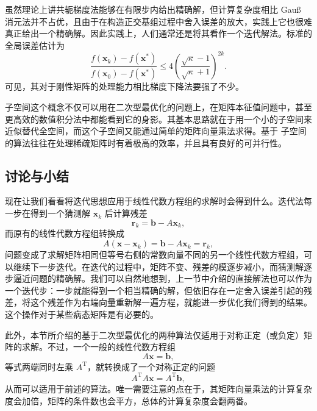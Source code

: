 虽然理论上讲共轭梯度法能够在有限步内给出精确解，但计算复杂度相比 Gauß 消元法并不占优，且由于在构造正交基组过程中舍入误差的放大，实践上它也很难真正给出一个精确解。因此实践上，人们通常还是将其看作一个迭代解法。标准的全局误差估计为
\begin{equation}
\frac{f(\bm x_k)-f(\bm x^*)}{f(\bm x_0)-f(\bm x^*)}
\le 4\left(\frac{\sqrt\kappa-1}{\sqrt\kappa+1}\right)^{2k}.
\tag{3.2.34}
\end{equation}
可见，其对于刚性矩阵的处理能力相比梯度下降法要强了不少。

 子空间这个概念不仅可以用在二次型最优化的问题上，在矩阵本征值问题中，甚至更高效的数值积分法中都能看到它的身影。其基本思路就在于用一个小的子空间来近似替代全空间，而这个子空间又能通过简单的矩阵向量乘法求得。基于  子空间的算法往往在处理稀疏矩阵时有着极高的效率，并且具有良好的可并行性。

\subsection{讨论与小结}

现在让我们看看将迭代思想应用于线性代数方程组的求解时会得到什么。迭代法每一步在得到一个猜测解 $\bm x_k$ 后计算残差
\begin{equation}
\bm r_k=\bm b-A\bm x_k,
\tag{3.2.35}
\end{equation}
而原有的线性代数方程组转换成
\begin{equation}
A(\bm x-\bm x_k)=\bm b-A\bm x_k=\bm r_k,
\tag{3.2.36}
\end{equation}
问题变成了求解矩阵相同但等号右侧的常数向量不同的另一个线性代数方程组，可以继续下一步迭代。在迭代的过程中，矩阵不变、残差的模逐步减小，而猜测解逐步逼近问题的精确解。我们可以自然地想到，上一节中介绍的直接解法也可以作为一个迭代步：一步就能得到一个相当精确的解，但依旧存在一定舍入误差引起的残差，将这个残差作为右端向量重新解一遍方程，就能进一步优化我们得到的结果。这个操作对于某些病态矩阵是有必要的。

此外，本节所介绍的基于二次型最优化的两种算法仅适用于对称正定（或负定）矩阵的求解。不过，一个一般的线性代数方程组
\begin{equation}
A\bm x=\bm b,
\tag{3.2.37}
\end{equation}
等式两端同时左乘 $A^{\mathrm T}$，就转换成了一个对称正定的问题
\begin{equation}
A^{\mathrm T}A\bm x=A^{\mathrm T}\bm b,
\tag{3.2.38}
\end{equation}
从而可以适用于前述的算法。唯一需要注意的点在于，其矩阵向量乘法的计算复杂度会加倍，矩阵的条件数也会平方，总体的计算复杂度会翻两番。

